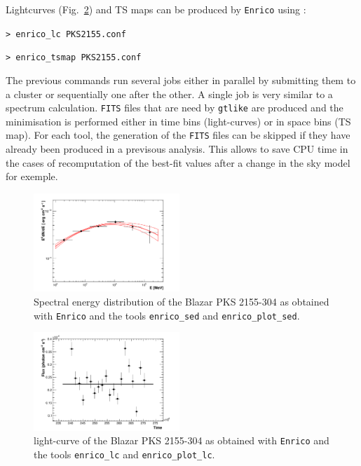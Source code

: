 \documentclass[a4paper]{article}
\begin{document}
Lightcurves (Fig.~\ref{fig:LC}) and TS maps can be produced by {\tt Enrico} using :

\mbox{{\tt> enrico\_lc PKS2155.conf}}

\mbox{{\tt> enrico\_tsmap PKS2155.conf}}

The previous commands run several jobs either in parallel by submitting them to a cluster or sequentially one after the other. A single job is very similar to a spectrum calculation. {\tt FITS} files that are need by {\tt gtlike} are produced and the minimisation is performed either in time bins (light-curves) or in space bins (TS map). For each tool, the generation of the {\tt FITS} files can be skipped if they have already been produced in a previsous analysis. This allows to save CPU time in the cases of recomputation of the best-fit values after a change in the sky model for exemple.

 \begin{figure}[ht!]
  \centering
  \includegraphics[width=0.49\textwidth]{icrc2013_89_01}
  \caption{Spectral energy distribution of the Blazar PKS 2155-304 as obtained with {\tt Enrico} and the tools {\tt enrico\_sed} and {\tt enrico\_plot\_sed}.}
  \label{fig:SED}
 \end{figure}

 \begin{figure}[ht!]
  \centering
  \includegraphics[width=0.49\textwidth]{icrc2013_89_02}
  \caption{light-curve of the Blazar PKS 2155-304 as obtained with {\tt Enrico} and the tools {\tt enrico\_lc} and {\tt enrico\_plot\_lc}.}
  \label{fig:LC}
 \end{figure}
\end{document}
